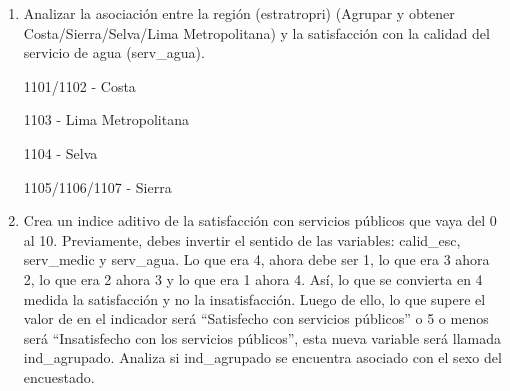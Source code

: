 \documentclass[
]{article}
\begin{document}
\begin{enumerate}
\def\labelenumi{\arabic{enumi}.}
\item
  Analizar la asociación entre la región (estratropri) (Agrupar y
  obtener Costa/Sierra/Selva/Lima Metropolitana) y la satisfacción con
  la calidad del servicio de agua (serv\_agua).

  1101/1102 - Costa

  1103 - Lima Metropolitana

  1104 - Selva

  1105/1106/1107 - Sierra
\item
  Crea un indice aditivo de la satisfacción con servicios públicos que
  vaya del 0 al 10. Previamente, debes invertir el sentido de las
  variables: calid\_esc, serv\_medic y serv\_agua. Lo que era 4, ahora
  debe ser 1, lo que era 3 ahora 2, lo que era 2 ahora 3 y lo que era 1
  ahora 4. Así, lo que se convierta en 4 medida la satisfacción y no la
  insatisfacción. Luego de ello, lo que supere el valor de en el
  indicador será ``Satisfecho con servicios públicos'' o 5 o menos será
  ``Insatisfecho con los servicios públicos'', esta nueva variable será
  llamada ind\_agrupado. Analiza si ind\_agrupado se encuentra asociado
  con el sexo del encuestado.
\end{enumerate}
\end{document}
